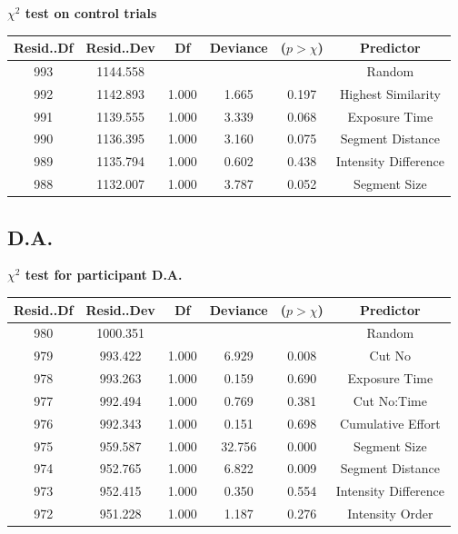 \documentclass{article}
\begin{document}
\textbf{$\chi^2$ test on control trials}
\label{table:participantsAnovaREControl}    
\begin{table}[ht]    
    \centering    
    \begin{tabular}{cccccc}
    \hline
    Resid..Df & Resid..Dev &    Df & Deviance & ($p > \chi$) &    Predictor \\
    \hline
        993 &   1144.558 &       &          &            &             Random \\
      992 &   1142.893 & 1.000 &    1.665 &      0.197 & Highest Similarity \\
      991 &   1139.555 & 1.000 &    3.339 &      0.068 &          Exposure Time \\
      990 &   1136.395 & 1.000 &    3.160 &      0.075 &          Segment Distance \\
      989 &   1135.794 & 1.000 &    0.602 &      0.438 &         Intensity Difference \\
      988 &   1132.007 & 1.000 &    3.787 &      0.052 &          Segment Size \\
    \hline
    \end{tabular}    
\end{table}
\clearpage

\subsection*{D.A.}
\label{table:participantsAnovaDATest}    
\textbf{$\chi^2$ test for participant D.A.}
 
\begin{table}[ht]
    \centering    
    \begin{tabular}{cccccc}
    \hline
    Resid..Df & Resid..Dev &    Df & Deviance & ($p > \chi$) &    Predictor \\
    \hline
      980 &   1000.351 &       &          &            &       Random \\
      979 &    993.422 & 1.000 &    6.929 &      0.008 &       Cut No \\
      978 &    993.263 & 1.000 &    0.159 &      0.690 &    Exposure Time \\
      977 &    992.494 & 1.000 &    0.769 &      0.381 &  Cut No:Time \\
      976 &    992.343 & 1.000 &    0.151 &      0.698 & Cumulative Effort \\
      975 &    959.587 & 1.000 &   32.756 &      0.000 &    Segment Size \\
      974 &    952.765 & 1.000 &    6.822 &      0.009 &    Segment Distance \\
      973 &    952.415 & 1.000 &    0.350 &      0.554 &   Intensity Difference \\
      972 &    951.228 & 1.000 &    1.187 &      0.276 &     Intensity Order \\
    \hline
    \end{tabular}    
\end{table}
\end{document}
